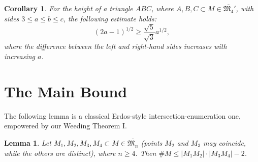 \documentclass[a4paper,14pt]{article} %
\theoremstyle{plain}
\newtheorem{lemma}[theorem]{Lemma}
\newtheorem{corollary}[theorem]{Corollary}
\theoremstyle{definition}
\begin{document}
\begin{corollary}
	\label{cor:sqrt_5_3}
	For the height of a triangle $ABC$, where ${A, B, C} \subset M \in \overline{\mathfrak{M}_4}'$, with sides $3 \leq a \leq b \leq c$, the following estimate holds:
	$$
		(2a-1)^{1/2} \geq \frac{\sqrt{5}}{\sqrt{3}} a^{1/2},
	$$
	where the difference between the left and right-hand sides increases with increasing $a$.
\end{corollary}

\section{The Main Bound}

The following lemma is a classical Erdos-style intersection-enumeration one,
empowered by our Weeding Theorem I.

\begin{lemma}
	\label{lem:intersection_enumeration}
	Let ${M_1, M_2, M_3, M_4} \subset M \in \overline{\mathfrak{M}_n}$ (points $M_2$ and $M_3$ may coincide, while the others are distinct), where $n \ge 4$. Then $\# M \le |M_1 M_2| \cdot |M_3 M_4| - 2$.
\end{lemma}
\end{document}
